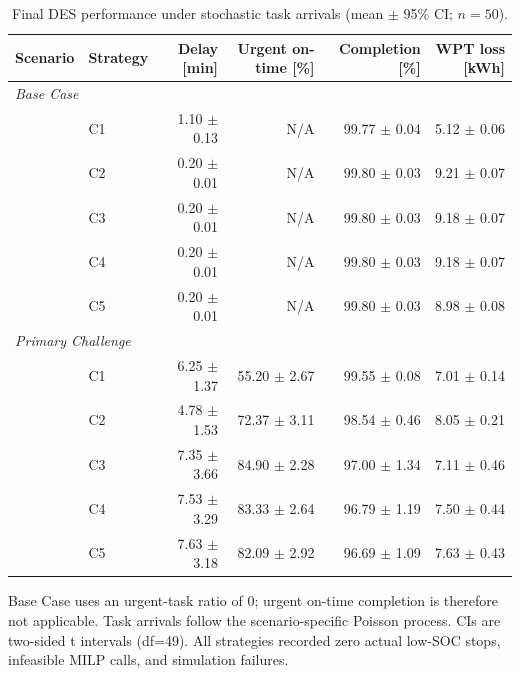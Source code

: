 \begin{table}[t]
\centering
\caption{Final DES performance under stochastic task arrivals (mean $\pm$ 95\% CI; $n=50$).}
\label{tab:final-performance}
\small
\begin{tabular}{llrrrr}
\toprule
Scenario & Strategy & Delay [min] & Urgent on-time [\%] & Completion [\%] & WPT loss [kWh] \\
\midrule
\multicolumn{6}{l}{\textit{Base Case}} \\
 & C1 & 1.10 $\pm$ 0.13 & N/A & 99.77 $\pm$ 0.04 & 5.12 $\pm$ 0.06 \\
 & C2 & 0.20 $\pm$ 0.01 & N/A & 99.80 $\pm$ 0.03 & 9.21 $\pm$ 0.07 \\
 & C3 & 0.20 $\pm$ 0.01 & N/A & 99.80 $\pm$ 0.03 & 9.18 $\pm$ 0.07 \\
 & C4 & 0.20 $\pm$ 0.01 & N/A & 99.80 $\pm$ 0.03 & 9.18 $\pm$ 0.07 \\
 & C5 & 0.20 $\pm$ 0.01 & N/A & 99.80 $\pm$ 0.03 & 8.98 $\pm$ 0.08 \\
\multicolumn{6}{l}{\textit{Primary Challenge}} \\
 & C1 & 6.25 $\pm$ 1.37 & 55.20 $\pm$ 2.67 & 99.55 $\pm$ 0.08 & 7.01 $\pm$ 0.14 \\
 & C2 & 4.78 $\pm$ 1.53 & 72.37 $\pm$ 3.11 & 98.54 $\pm$ 0.46 & 8.05 $\pm$ 0.21 \\
 & C3 & 7.35 $\pm$ 3.66 & 84.90 $\pm$ 2.28 & 97.00 $\pm$ 1.34 & 7.11 $\pm$ 0.46 \\
 & C4 & 7.53 $\pm$ 3.29 & 83.33 $\pm$ 2.64 & 96.79 $\pm$ 1.19 & 7.50 $\pm$ 0.44 \\
 & C5 & 7.63 $\pm$ 3.18 & 82.09 $\pm$ 2.92 & 96.69 $\pm$ 1.09 & 7.63 $\pm$ 0.43 \\
\bottomrule
\end{tabular}
\vspace{2pt}
\begin{minipage}{0.98\linewidth}\footnotesize Base Case uses an urgent-task ratio of 0; urgent on-time completion is therefore not applicable. Task arrivals follow the scenario-specific Poisson process. CIs are two-sided t intervals (df=49). All strategies recorded zero actual low-SOC stops, infeasible MILP calls, and simulation failures.\end{minipage}
\end{table}
